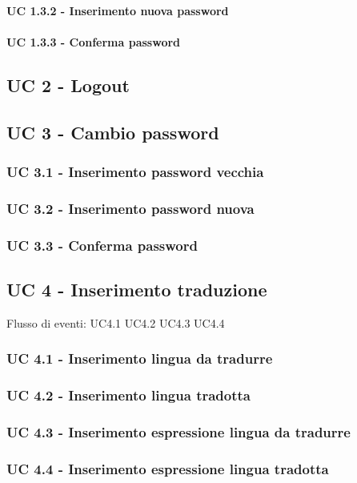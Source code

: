         \paragraph{UC 1.3.2 - Inserimento nuova password}
        \paragraph{UC 1.3.3 - Conferma password}
\subsection{UC 2 - Logout} %
\subsection{UC 3 - Cambio password}
    \subsubsection{UC 3.1 - Inserimento password vecchia}
    \subsubsection{UC 3.2 - Inserimento password nuova}
    \subsubsection{UC 3.3 - Conferma password}
\subsection{UC 4 - Inserimento traduzione}
Flusso di eventi: UC4.1 UC4.2 UC4.3 UC4.4
    \subsubsection{UC 4.1 - Inserimento lingua da tradurre}
    \subsubsection{UC 4.2 - Inserimento lingua tradotta}
    \subsubsection{UC 4.3 - Inserimento espressione lingua da tradurre}
    \subsubsection{UC 4.4 - Inserimento espressione lingua tradotta}
